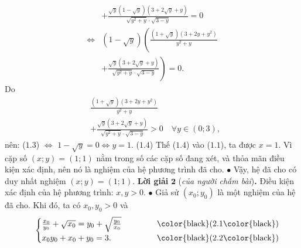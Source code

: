 \begin{multicols}{2}
\begin{align*}
		&+ \frac{{\sqrt y \left( {1 - \sqrt y } \right)\left( {3 + 2\sqrt y  + y} \right)}}{{\sqrt {{y^2} + y}  \cdot \sqrt {3 - y} }} = 0\\
		\Leftrightarrow&\left( {1 - \sqrt y } \right)\left( \frac{{\left( {1 + \sqrt y } \right)\left( {3 + 2y + {y^2}} \right)}}{{{y^2} + y}}\right. \\
		&\left.+ \frac{{\sqrt y \left( {3 + 2\sqrt y  + y} \right)}}{{\sqrt {{y^2} + y}  \cdot \sqrt {3 - y} }} \right) = 0. \tag{$1.3$}
	\end{align*}
	Do
	\begin{align*}
		&\frac{{\left( {1 + \sqrt y } \right)\left( {3 + 2y + {y^2}} \right)}}{{{y^2} + y}} \\
		&+ \frac{{\sqrt y \left( {3 + 2\sqrt y  + y} \right)}}{{\sqrt {{y^2} + y}  \cdot \sqrt {3 - y} }} > 0 \quad\forall y \in \left( {0;3} \right),
	\end{align*}
	nên: ($1.3$) $\Leftrightarrow$ $1- \sqrt{y} = 0 \Leftrightarrow y =1$. \hfill ($1.4$)   
	\vskip 0.05cm
	Thế ($1.4$) vào ($1.1$), ta được $x = 1$.
	\vskip 0.05cm
	Vì cặp số $(x; y) = (1; 1)$ nằm trong số các cặp số đang xét, và thỏa mãn điều kiện xác định, nên nó là nghiệm của hệ phương trình đã cho.
	\vskip 0.05cm
	$\bullet$ Vậy, hệ đã cho có duy nhất nghiệm $(x; y) = (1; 1)$.
	\vskip 0.05cm
	\textbf{\color{thachthuctoanhoc}Lời giải} $\pmb{2}$ (\textit{của người chấm bài})\textbf{\color{thachthuctoanhoc}.}
	\vskip 0.05cm
	Điều kiện xác định của hệ phương trình: $x, y > 0$.
	\vskip 0.05cm
	$\bullet$ Giả sử $\left( {{x_0};{y_0}} \right)$ là một nghiệm của hệ đã cho. Khi đó, ta có $x_0, y_0 > 0$  và
	\begin{align*}
		\quad\,\,\begin{cases}
			\frac{{{x_0}}}{{{y_0}}} + \sqrt {{x_0}}  = {y_0} + \sqrt {\frac{{{y_0}}}{{{x_0}}}} \quad\quad\quad\,\, &\text{\color{black}(}2.1\text{\color{black})}\\
			{x_0}{y_0} + {x_0} + {y_0} = 3.\quad\quad\quad\quad\,\, &\text{\color{black}(}2.2\text{\color{black})}
		\end{cases}
	\end{align*}

\end{multicols}
